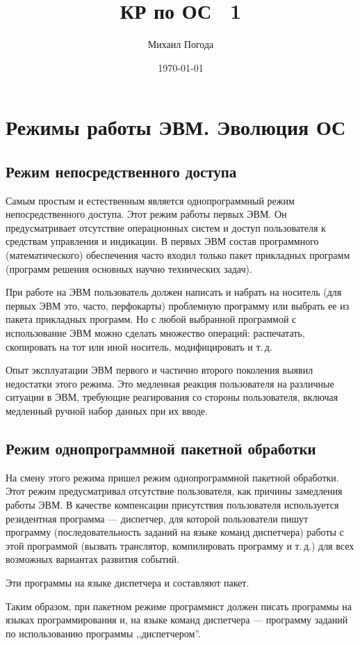 \documentclass[a5paper, 10pt, notitlepage, pdftex,headsepline]{scrartcl}
\author{Михаил Погода}
\title{КР по ОС \textnumero~1}
\date{\today}
\begin{document}
\section{Режимы работы ЭВМ. Эволюция ОС}
  \subsection{Режим непосредственного доступа}
    Самым простым и естественным является однопрограммный режим непосредственного доступа.
    Этот режим работы первых ЭВМ.
    Он предусматривает отсутствие операционных систем и доступ
    пользователя к средствам управления и индикации.
    В первых ЭВМ состав программного (математического) обеспечения часто
    входил только пакет прикладных программ (программ решения основных
    научно технических задач).

    При работе на ЭВМ пользователь должен написать и набрать на носитель
    (для первых ЭВМ это, часто, перфокарты) проблемную программу или
    выбрать ее из пакета прикладных программ.
    Но с любой выбранной программой с использование ЭВМ можно сделать
    множество операций: распечатать, скопировать на тот или иной
    носитель, модифицировать и т.\,д.

    Опыт эксплуатации ЭВМ первого и частично второго поколения выявил
    недостатки этого режима.
    Это медленная реакция пользователя на различные ситуации в ЭВМ,
    требующие реагирования со стороны пользователя, включая медленный
    ручной набор данных при их вводе.
  \subsection{Режим однопрограммной пакетной обработки}
    На смену этого режима пришел режим однопрограммной пакетной обработки.
    Этот режим предусматривал отсутствие пользователя, как причины замедления работы ЭВМ.
    В качестве компенсации присутствия пользователя используется
    резидентная программа --- диспетчер, для которой пользователи пишут
    программу (последовательность заданий на языке команд диспетчера)
    работы с этой программой (вызвать транслятор, компилировать
    программу и т.\,д.) для всех возможных вариантах развития событий.

    Эти программы на языке диспетчера и составляют пакет.

    Таким образом, при пакетном режиме программист должен писать
    программы на языках программирования и, на языке команд диспетчера ---
    программу заданий по использованию программы ,,диспетчером''.
\end{document}
